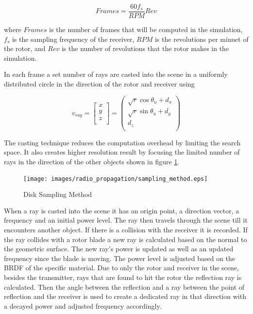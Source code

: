 \begin{equation}
	Frames = \frac{60  f_s}{RPM} Rev
	\label{eqn:frames}
\end{equation}

where $Frames$ is the number of frames that will be computed in the simulation, $f_s$ is the sampling frequency of the receiver, $RPM$ is the revolutions per minuet of the rotor, and $Rev$ is the number of revolutions that the rotor makes in the simulation.

In each frame a set number of rays are casted into the scene in a uniformly distributed circle in the direction of the rotor and receiver using

\begin{equation}
	v_{ray} = \begin{bmatrix}
			x \\
			y \\
			z \\
	\end{bmatrix}
	= \begin{pmatrix}
			\sqrt{r} \cos{\theta_u}  + d_x\\
			\sqrt{r} \sin{\theta_u}  + d_y \\
			d_z \\
	\end{pmatrix}
	\label{eqn:disk}
\end{equation}

The casting technique reduces the computation overhead by limiting the search space. It also creates higher resolution result by focusing the limited number of rays in the direction of the other objects shown in figure \ref{fig:samp_method}.

\begin{figure}
	\begin{center}
		\texttt{[image: images/radio\_propagation/sampling\_method.eps]}
		\caption{Disk Sampling Method}
		\label{fig:samp_method}
	\end{center}
\end{figure}

When a ray is casted into the scene it has an origin point, a direction vector, a frequency and an initial power level. The ray then travels through the scene till it encounters another object. If there is a collision with the receiver it is recorded. If the ray collides with a rotor blade a new ray is calculated based on the normal to the geometric surface. The new ray's power is updated as well as an updated frequency since the blade is moving. The power level is adjusted based on the BRDF of the specific material. Due to only the rotor and receiver in the scene, besides the transmitter, rays that are found to hit the rotor the reflection ray is calculated. Then the angle between the reflection and a ray between the point of reflection and the receiver is used to create a dedicated ray in that direction with a decayed power and adjusted frequency accordingly.

